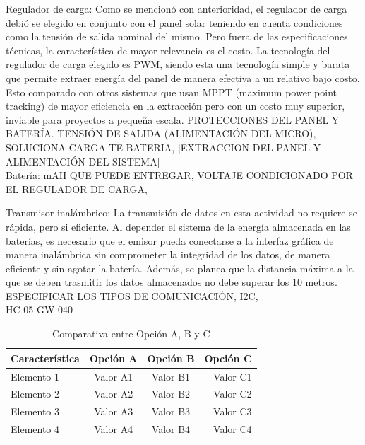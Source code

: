 \documentclass[a4paper,12pt]{article}
\begin{document}
Regulador de carga:
Como se mencionó con anterioridad, el regulador de carga debió se elegido en conjunto con el panel solar teniendo en cuenta condiciones como la tensión de salida nominal del mismo. Pero fuera de las especificaciones técnicas, la característica de mayor relevancia es el costo. La tecnología del regulador de carga elegido es PWM, siendo esta una tecnología simple y barata que permite extraer energía del panel de manera efectiva a un relativo bajo costo. Esto comparado con otros sistemas que usan MPPT (maximum power point tracking) de mayor eficiencia en la extracción pero con un costo muy superior, inviable para proyectos a pequeña escala. PROTECCIONES DEL PANEL Y BATERÍA. TENSIÓN DE SALIDA (ALIMENTACIÓN DEL MICRO), SOLUCIONA CARGA TE BATERIA, [EXTRACCION DEL PANEL Y ALIMENTACIÓN DEL SISTEMA]\\

Batería:
mAH QUE PUEDE ENTREGAR, VOLTAJE CONDICIONADO POR EL REGULADOR DE CARGA, 

Transmisor inalámbrico:
La transmisión de datos en esta actividad no requiere se rápida, pero si eficiente. Al depender el sistema de la energía almacenada en las baterías, es necesario que el emisor pueda conectarse a la interfaz gráfica de manera inalámbrica sin comprometer la integridad de los datos, de manera eficiente y sin agotar la batería. Además, se planea que la distancia máxima a la que se deben trasmitir los datos almacenados no debe superar los 10 metros. ESPECIFICAR LOS TIPOS DE COMUNICACIÓN, I2C, \\
HC-05 GW-040 \\

\begin{table}[H]
\centering
    \begin{tabular}{|l|c|c|r|}
    \hline
    \textbf{Característica} & \textbf{Opción A} & \textbf{Opción B} & \textbf{Opción C} \\
    \hline
    Elemento 1 & Valor A1 & Valor B1 & Valor C1 \\
    \hline
    Elemento 2 & Valor A2 & Valor B2 & Valor C2 \\
    \hline
    Elemento 3 & Valor A3 & Valor B3 & Valor C3 \\
    \hline
    Elemento 4 & Valor A4 & Valor B4 & Valor C4 \\
    \hline
    \end{tabular}
    \caption{Comparativa entre Opción A, B y C}
    \label{tab:comparativa}
\end{table}
\end{document}

